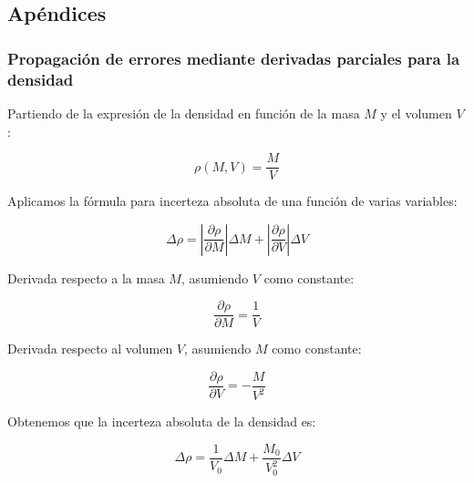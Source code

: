 \subsection{Apéndices}
\label{subsec:apendices}


\subsubsection{Propagación de errores mediante derivadas parciales para la densidad}
\label{subsubsec:propagacion-errores-densidad}

Partiendo de la expresión de la densidad en función de la masa $M$ y el volumen $V$:

\begin{equation}
    \rho(M, V) = \frac{M}{V}
    \label{eq:funcion-densidad}
\end{equation}

Aplicamos la fórmula para incerteza absoluta de una función de varias variables:

\begin{equation}
    \Delta \rho = \left| \frac{\partial \rho}{\partial M} \right| \Delta M + \left| \frac{\partial \rho}{\partial V} \right| \Delta V
    \label{eq:incerteza-general}
\end{equation}

Derivada respecto a la masa $M$, asumiendo $V$ como constante:

\begin{equation}
    \frac{\partial \rho}{\partial M} = \frac{1}{V}
    \label{eq:derivada-masa}
\end{equation}

Derivada respecto al volumen $V$, asumiendo $M$ como constante:

\begin{equation}
    \frac{\partial \rho}{\partial V} = -\frac{M}{V^2}
    \label{eq:derivada-volumen}
\end{equation}

Obtenemos que la incerteza absoluta de la densidad es:

\begin{equation}
    \Delta \rho = \frac{1}{V_0} \Delta M + \frac{M_0}{V_0^2} \Delta V
    \label{eq:incerteza-final}
\end{equation}

